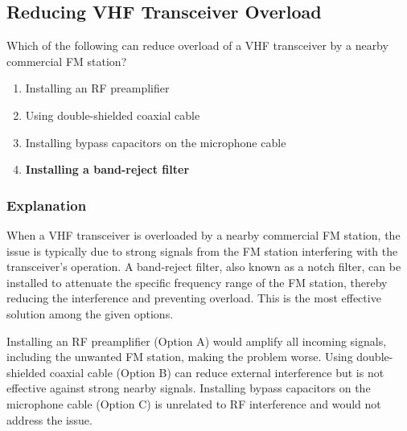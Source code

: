 \subsection{Reducing VHF Transceiver Overload}
\label{T7B07}

\begin{tcolorbox}[colback=gray!10!white,colframe=black!75!black,title=T7B07]
Which of the following can reduce overload of a VHF transceiver by a nearby commercial FM station?
\begin{enumerate}[noitemsep]
    \item Installing an RF preamplifier
    \item Using double-shielded coaxial cable
    \item Installing bypass capacitors on the microphone cable
    \item \textbf{Installing a band-reject filter}
\end{enumerate}
\end{tcolorbox}

\subsubsection*{Explanation}
When a VHF transceiver is overloaded by a nearby commercial FM station, the issue is typically due to strong signals from the FM station interfering with the transceiver's operation. A band-reject filter, also known as a notch filter, can be installed to attenuate the specific frequency range of the FM station, thereby reducing the interference and preventing overload. This is the most effective solution among the given options. 

Installing an RF preamplifier (Option A) would amplify all incoming signals, including the unwanted FM station, making the problem worse. Using double-shielded coaxial cable (Option B) can reduce external interference but is not effective against strong nearby signals. Installing bypass capacitors on the microphone cable (Option C) is unrelated to RF interference and would not address the issue.